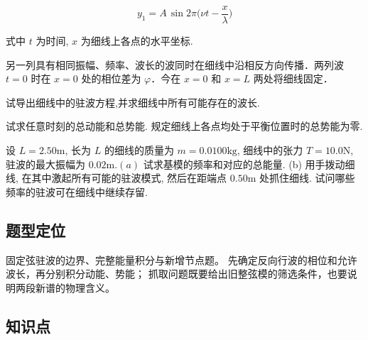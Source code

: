 \documentclass[UTF8,fontset=fandol,a4paper,11pt]{ctexart}
\newcommand{\figcaption}[1]{\par\vspace{2pt}{\small\color{muted}#1}\par}
\begin{document}
\[
y_{ 1 } = A \, \sin 2 \pi \biggl ( \nu t - \frac{ x } { \lambda } \biggr )
\]

式中 \(t\) 为时间, \(x\) 为细线上各点的水平坐标.

另一列具有相同振幅、频率、波长的波同时在细线中沿相反方向传播．两列波
\(t=0\) 时在 \(x=0\) 处的相位差为 \(\varphi\)．今在 \(x=0\) 和 \(x=L\)
两处将细线固定．

试导出细线中的驻波方程,并求细线中所有可能存在的波长.

试求任意时刻的总动能和总势能.
规定细线上各点均处于平衡位置时的总势能为零.

设 \(L=2.50 \mathrm{m}\), 长为 \(L\) 的细线的质量为
\(m=0.0100 \mathrm{kg}\), 细线中的张力 \(T=10.0 \mathrm{N}\),
驻波的最大振幅为 \(0.02 \mathrm{m} .(a)\) 试求基模的频率和对应的总能量.
(b) 用手拨动细线, 在其中激起所有可能的驻波模式, 然后在距端点
\(0.50 \mathrm{m}\) 处抓住细线. 试问哪些频率的驻波可在细线中继续存留.

\begin{center}\begin{minipage}{\linewidth}\centering{}\figcaption{图 7.41}\end{minipage}\end{center}



\subsection*{题型定位}

固定弦驻波的边界、完整能量积分与新增节点题。
先确定反向行波的相位和允许波长，再分别积分动能、势能；
抓取问题既要给出旧整弦模的筛选条件，也要说明两段新谱的物理含义。



\subsection*{知识点}
\end{document}
